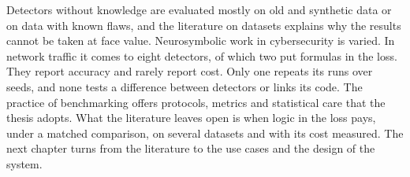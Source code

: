 Detectors without knowledge are evaluated mostly on old and synthetic data or on
data with known flaws, and the literature on datasets explains why the results
cannot be taken at face value. Neurosymbolic work in cybersecurity is varied. In
network traffic it comes to eight detectors, of which two put formulas in the
loss. They report accuracy and rarely report cost. Only one repeats its runs
over seeds, and none tests a difference between detectors or links its code. The practice of benchmarking offers protocols, metrics and
statistical care that the thesis adopts. What the literature leaves open is
when logic in the loss pays, under a matched comparison, on several datasets and
with its cost measured. The next chapter turns from the
literature to the use cases and the design of the system.
